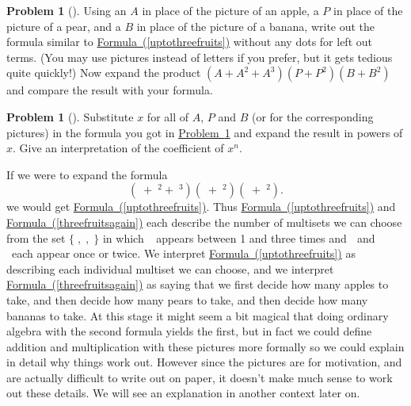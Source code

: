 \documentclass[10pt,]{book}
\theoremstyle{plain}
\theoremstyle{definition}
\newtheorem{activity}[project]{Problem}
\theoremstyle{definition}
\numberwithin{equation}{chapter}
\newcommand{\apple}{\text{🍎}}
\newcommand{\ap}{\apple}
\newcommand{\banana}{\text{🍌}}
\newcommand{\ba}{\banana}
\newcommand{\pear}{\text{🍐}}
\newcommand{\pe}{\pear}
\begin{document}
%
\begin{activity}[] \label{twopiecesoffruit}
Using an \(A\) in place of the picture of an apple, a \(P\) in place of the picture of a pear, and a \(B\) in place of the picture of a banana, write out the formula similar to \hyperref[uptothreefruits]{Formula~(\ref{uptothreefruits})} without any dots for left out terms. (You may use pictures instead of letters if you prefer, but it gets tedious quite quickly!) Now expand the product \((A+A^2+A^3)(P+P^2)(B+B^2)\) and compare the result with your formula.%
\end{activity}
\begin{activity}[] \label{activity-179}
Substitute \(x\) for all of \(A\), \(P\) and \(B\) (or for the corresponding pictures) in the formula you got in \hyperref[twopiecesoffruit]{Problem~\ref{twopiecesoffruit}} and expand the result in powers of \(x\). Give an interpretation of the coefficient of \(x^n\).%
\end{activity}
If we were to expand the formula%
\begin{equation}
(\ap+\ap^2+\ap^3)(\pe+\pe^2)(\ba+\ba^2).\label{threefruitsagain}
\end{equation}
we would get \hyperref[uptothreefruits]{Formula~(\ref{uptothreefruits})}. Thus \hyperref[uptothreefruits]{Formula~(\ref{uptothreefruits})} and \hyperref[threefruitsagain]{Formula~(\ref{threefruitsagain})} each describe the number of multisets we can choose from the set \(\{\ap,\pe,\ba\}\) in which \(\apple\)~appears between 1 and three times and \(\pear\) and \(\banana\)~each appear once or twice. We interpret \hyperref[uptothreefruits]{Formula~(\ref{uptothreefruits})} as describing each individual multiset we can choose, and we interpret \hyperref[threefruitsagain]{Formula~(\ref{threefruitsagain})} as saying that we first decide how many apples to take, and then decide how many pears to take, and then decide how many bananas to take. At this stage it might seem a bit magical that doing ordinary algebra with the second formula yields the first, but in fact we could define addition and multiplication with these pictures more formally so we could explain in detail why things work out. However since the pictures are for motivation, and are actually difficult to write out on paper, it doesn't make much sense to work out these details. We will see an explanation in another context later on.%
\typeout{************************************************}
\typeout{************************************************}
\end{document}
